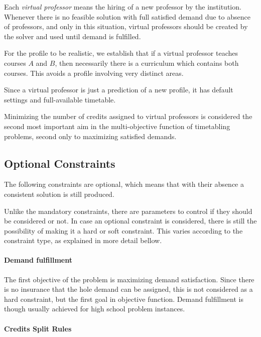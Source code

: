 Each \textit{virtual professor} means the hiring of a new professor by the institution. Whenever there is no feasible solution with full satisfied demand due to absence of professors, and only in this situation, virtual professors should be created by the solver and used until demand is fulfilled.

For the profile to be realistic, we establish that if a virtual professor teaches courses $A$ and $B$, then necessarily there is a curriculum which contains both courses. This avoids a profile involving very distinct areas. 

Since a virtual professor is just a prediction of a new profile, it has default settings and full-available timetable.

Minimizing the number of credits assigned to virtual professors is considered the second most important aim in the multi-objective function of timetabling problems, second only to maximizing satisfied demands.


\subsection{Optional Constraints}
\label{subsec:optional}

The following constraints are optional, which means that with their absence a consistent solution is still produced.

Unlike the mandatory constraints, there are parameters to control if they should be considered or not. In case an optional constraint is considered, there is still the possibility of making it a hard or soft constraint. This varies according to the constraint type, as explained in more detail bellow.


\paragraph{Demand fulfillment}
\label{constrdemandfulfillm}

The first objective of the problem is maximizing demand satisfaction. Since there is no insurance that the hole demand can be assigned, this is not considered as a hard constraint, but the first goal in objective function. Demand fulfillment is though usually achieved for high school problem instances.



\paragraph{Credits Split Rules}
\label{constrsplit}

